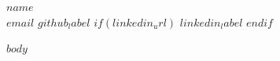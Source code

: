 \documentclass[10pt,a4paper]{article}
\begin{document}
\begin{center}
  {\LARGE\bfseries $name$}\\[4pt]
  \small
  \href{mailto:$email$}{$email$}
  \enspace \textbar\enspace
  \href{$github_url$}{$github_label$}
$if(linkedin_url)$
  \enspace \textbar\enspace
  \href{$linkedin_url$}{$linkedin_label$}
$endif$
\end{center}

\vspace{-6pt}

$body$
\end{document}
